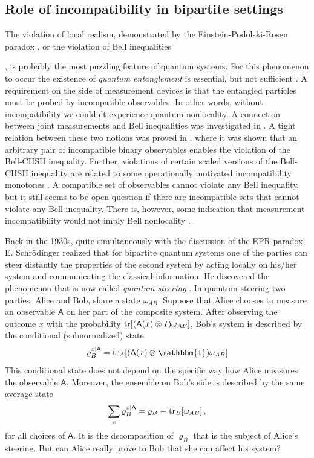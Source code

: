 \documentclass[12pt]{iopart}
\theoremstyle{definition}
\newcommand{\id}{\mathbbm{1}} %
\newcommand{\Ao}{\mathsf{A}}%
\begin{document}
\subsection{Role of incompatibility in bipartite settings}

The violation of local realism, demonstrated by the Einstein-Podolski-Rosen paradox \cite{EiPoRo35}, or the violation of Bell inequalities {\cite{Bell64}, is probably the most puzzling feature of quantum systems.
For this phenomenon to occur the existence of \emph{quantum entanglement} 
is essential, but not sufficient \cite{Werner89}. 
A requirement on the side of measurement devices is that the entangled 
particles must be probed by incompatible observables. 
In other words, without incompatibility we couldn't experience quantum nonlocality. 
A connection between joint measurements and Bell inequalities was investigated in \cite{SoAnBaKi05}. 
A tight relation between these two notions was proved in \cite{WoPeFe09}, where it was shown that an arbitrary pair of incompatible binary observables enables the violation of the Bell-CHSH inequality.
Further, violations of certain scaled versions of the Bell-CHSH inequality are related to some operationally motivated incompatibility monotones \cite{HeKiRe15}.
A compatible set of observables cannot violate any Bell inequality, but it still seems to be open question if there are incompatible sets that cannot violate any Bell inequality.
There is, however, some indication that measurement incompatibility would not imply Bell nonlocality \cite{QuBoHiBr15}.

Back in the 1930s, quite simultaneously with the discussion of the EPR paradox, 
E. Schr\"odinger realized \cite{Schrodinger35} that for bipartite quantum 
systems one of the parties can steer distantly the properties of the second
system by acting locally on his/her system and communicating
the classical information. 
He discovered the phenomenon that is now called \emph{quantum 
steering} \cite{WiJoDo07}. 
In quantum steering two parties, Alice and Bob, share a state $\omega_{AB}$. 
Suppose that Alice chooses to measure an observable $\Ao$ on her part of the composite system. 
After observing the outcome $x$ with the probability ${\rm tr}[(\Ao(x)\otimes I)\omega_{AB}]$, 
Bob's system is described by the conditional (subnormalized)
state 
\begin{equation}
\varrho_{B}^{x|\Ao}={\rm tr}_A [(\Ao(x)\otimes \id)\omega_{AB}]
\end{equation}
This conditional state does not depend on the specific way how Alice measures the observable $\Ao$.
Moreover, the ensemble on Bob's side is described by the same average state
\begin{equation}
\sum_x \varrho_B^{x|\Ao}=\varrho_B\equiv{\rm tr}_B[\omega_{AB}] \, , 
\end{equation}
for all choices of $\Ao$.
It is the decomposition of $\varrho_B$ that is the subject of Alice's 
steering. 
But can Alice really prove to Bob that she can affect his system?

}
\end{document}
